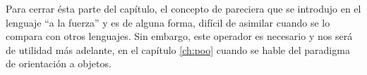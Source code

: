 Para cerrar ésta parte del capítulo, el concepto de  pareciera que se introdujo en el lenguaje "`a la fuerza"' y es de alguna forma, difícil de asimilar cuando se lo compara con otros lenguajes. Sin embargo, este operador es necesario y nos será de utilidad más adelante, en el capítulo \ref{ch:poo} cuando se hable del paradigma de orientación a objetos.